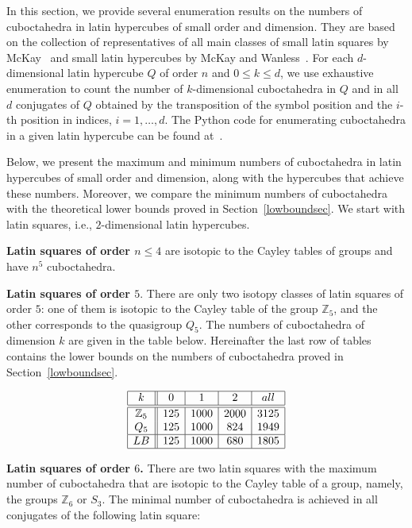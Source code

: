 \documentclass[a4paper]{article}
\begin{document}
In this section, we provide several enumeration results on the numbers of cuboctahedra in latin hypercubes of small order and dimension.  They are based on the collection of representatives of all main classes of small latin squares by McKay~\cite{mckay.LSsite} and  small latin hypercubes by McKay and Wanless~\cite{KayWan.census}.   For each  $d$-dimensional latin hypercube $Q$ of order $n$ and $0 \leq k \leq d$, we use exhaustive enumeration to count the number of $k$-dimensional cuboctahedra  in $Q$ and  in  all $d$ conjugates of $Q$ obtained by  the transposition of the symbol position and the $i$-th position in indices,  $i = 1, \ldots, d$. The Python code for enumerating cuboctahedra in a given latin hypercube can be found at~\cite{cuboctahedra.code}.  


Below, we present the maximum and minimum numbers of cuboctahedra in latin hypercubes of small order and dimension, along with the hypercubes that achieve these numbers.  Moreover, we compare the minimum numbers of cuboctahedra with the theoretical lower bounds proved in Section~\ref{lowboundsec}. We start with latin squares, i.e., $2$-dimensional latin hypercubes.


\textbf{Latin squares of order $n \leq 4$} are isotopic to the Cayley tables of groups and have $n^5$ cuboctahedra. 

\textbf{Latin squares of order $5$}.
There are only two isotopy classes of latin squares of order $5$: one of them is isotopic to the Cayley table of the group $\mathbb{Z}_5$, and the other corresponds to the quasigroup $Q_5$.  The numbers of cuboctahedra of dimension $k$ are given in the table below. Hereinafter the last row of tables contains the lower bounds on the numbers of cuboctahedra   proved in Section~\ref{lowboundsec}.

$$
\begin{array}{|c||c|c|c|c|}
\hline
k & 0 & 1 & 2 & all \\
\hline
\hline
\mathbb{Z}_5 & 125 & 1000 & 2000 & 3125 \\
Q_5 & 125 & 1000 & 824 & 1949 \\
\hline
LB & 125 & 1000 & 680 & 1805 \\
\hline
\end{array}
$$



\textbf{Latin squares of order $6$.}
 There are  two  latin squares with  the maximum number of cuboctahedra   that are isotopic to the Cayley table of a group, namely, the groups $\mathbb{Z}_6$ or $S_3$.  The minimal number of cuboctahedra is achieved in all conjugates of the following  latin square:
\end{document}
